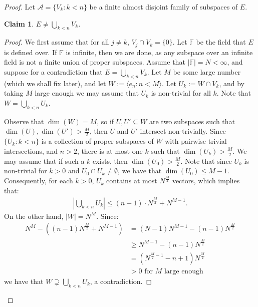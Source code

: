\documentclass[11pt,reqno]{amsart}
\theoremstyle{plain}
\numberwithin{equation}{section}
\newtheorem{claim}{Claim}
\theoremstyle{definition}
\renewcommand{\c}[1]{\langle #1 \rangle}
\renewcommand{\mod}[1]{\left| #1 \right|}
\newcommand{\cal}{\mathcal}
\newcommand{\A}{\cal{A}}
\newenvironment{midproof}[1][Proof]
  {\begin{proof}[#1]\renewcommand{\qedsymbol}{$\blacksquare$}}
  {\end{proof}}
\begin{document}
\begin{proof}
    Let $\A = \{V_k : k < n\}$ be a finite almost disjoint family of subspaces of $E$. 

    \begin{claim}
    \label{claim:E.not.union}
        $E \neq \bigcup_{k<n} V_k$.
    \end{claim}

    \begin{midproof}
        We first assume that for all $j \neq k$, $V_j \cap V_k = \{0\}$. Let $\mathbb{F}$ be the field that $E$ is defined over. If $\mathbb{F}$ is infinite, then we are done, as any subspace over an infinite field is not a finite union of proper subspaces. Assume that $|\mathbb{F}| = N < \infty$, and suppose for a contradiction that $E = \bigcup_{k<n} V_k$. Let $M$ be some large number (which we shall fix later), and let $W := \c{e_n : n < M}$. Let $U_k := W \cap V_k$, and by taking $M$ large enough we may assume that $U_k$ is non-trivial for all $k$. Note that $W = \bigcup_{k<n} U_k$.
        
        Observe that $\dim(W) = M$, so if $U,U' \subseteq W$ are two subspaces such that $\dim(U),\dim(U') > \frac{M}{2}$, then $U$ and $U'$ intersect non-trivially. Since $\{U_k : k < n\}$ is a collection of proper subspaces of $W$ with pairwise trivial intersections, and $n > 2$, there is at most one $k$ such that $\dim(U_k) > \frac{M}{2}$. We may assume that if such a $k$ exists, then $\dim(U_0) > \frac{M}{2}$. Note that since $U_k$ is non-trivial for $k > 0$ and $U_0 \cap U_k \neq \emptyset$, we have that $\dim(U_0) \leq M - 1$. Consequently, for each $k > 0$, $U_k$ contains at most $N^{\frac{M}{2}}$ vectors, which implies that:
        \begin{align*}
            \mod{\bigcup_{k<n} U_k} \leq (n -1) \cdot N^{\frac{M}{2}} + N^{M-1}.
        \end{align*}
        On the other hand, $|W| = N^M$. Since:
        \begin{align*}
            N^M - ((n - 1)N^{\frac{M}{2}} + N^{M-1}) &= (N - 1)N^{M-1} - (n - 1)N^{\frac{M}{2}} \\
            &\geq N^{M-1} - (n-1)N^\frac{M}{2} \\
            &= (N^{\frac{M}{2} - 1} - n + 1)N^\frac{M}{2} \\
            &> 0 \text{ for $M$ large enough}
        \end{align*}
        we have that $W \supsetneq \bigcup_{k<n} U_k$, a contradiction.


\end{midproof}
\end{proof}
\end{document}
